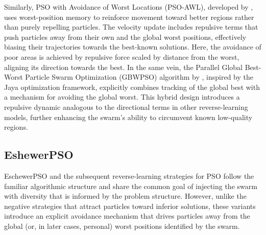 {Similarly, PSO with Avoidance of Worst Locations (PSO-AWL), developed by \citet{mason2016avoidance}, uses worst-position memory to reinforce movement toward better regions rather than purely repelling particles. The velocity update includes repulsive terms that push particles away from their own and the global worst positions, effectively biasing their trajectories towards the best-known solutions. Here, the avoidance of poor areas is achieved by repulsive force scaled by distance from the worst, aligning its direction towards the best. In the same vein, the Parallel Global Best-Worst Particle Swarm Optimization (GBWPSO) algorithm by \citet{kumar2023parallel}, inspired by the Jaya optimization framework, explicitly combines tracking of the global best with a mechanism for avoiding the global worst. This hybrid design introduces a repulsive dynamic analogous to the directional terms in other reverse-learning models, further enhancing the swarm’s ability to circumvent known low-quality regions.

\subsection{EshewerPSO}

EschewerPSO and the subsequent reverse-learning strategies for PSO follow the familiar algorithmic structure and share the common goal of injecting the swarm with diversity that is informed by the problem structure. However, unlike the negative strategies that attract particles toward inferior solutions, these variants introduce an explicit avoidance mechanism that drives particles away from the global (or, in later cases, personal) worst positions identified by the swarm.

}
